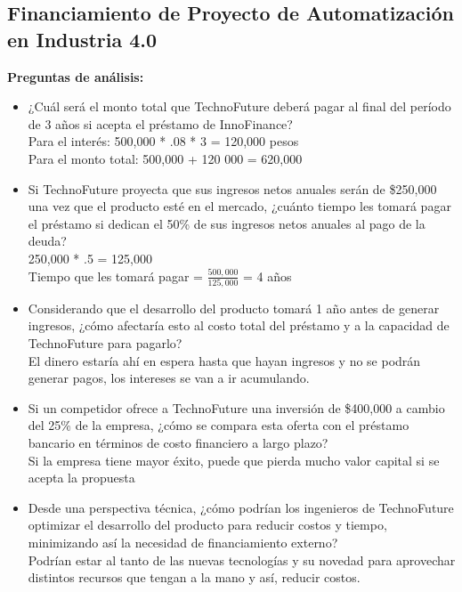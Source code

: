 \documentclass[letterpaper,12pt]{article}
\begin{document}
\begin{sloppypar}
\subsection{Financiamiento de Proyecto de Automatización en Industria 4.0}
\textbf{Preguntas de análisis:}
\begin{itemize}
    \item ¿Cuál será el monto total que TechnoFuture deberá pagar al final del período de 3 años si acepta el préstamo de InnoFinance? \\ Para el interés: 500,000 * .08 * 3 = 120,000 pesos \\ Para el monto total: 500,000 + 120 000 = 620,000
    \item Si TechnoFuture proyecta que sus ingresos netos anuales serán de \$250,000 una vez que el producto esté en el mercado, ¿cuánto tiempo les tomará pagar el préstamo si dedican el 50\% de sus ingresos netos anuales al pago de la deuda? \\ 250,000 * .5 = 125,000 \\ Tiempo que les tomará pagar = $\frac{500,000}{125,000}$ = 4 años
    \item Considerando que el desarrollo del producto tomará 1 año antes de generar ingresos, ¿cómo afectaría esto al costo total del préstamo y a la capacidad de TechnoFuture para pagarlo? \\ El dinero estaría ahí en espera hasta que hayan ingresos y no se podrán generar pagos, los intereses se van a ir acumulando.
    \item Si un competidor ofrece a TechnoFuture una inversión de \$400,000 a cambio del 25\% de la empresa, ¿cómo se compara esta oferta con el préstamo bancario en términos de costo financiero a largo plazo? \\ Si la empresa tiene mayor éxito, puede que pierda mucho valor capital si se acepta la propuesta
    \item Desde una perspectiva técnica, ¿cómo podrían los ingenieros de TechnoFuture optimizar el desarrollo del producto para reducir costos y tiempo, minimizando así la necesidad de financiamiento externo? \\ Podrían estar al tanto de las nuevas tecnologías y su novedad para aprovechar distintos recursos que tengan a la mano y así, reducir costos.
\end{itemize}


\end{sloppypar}
\end{document}
